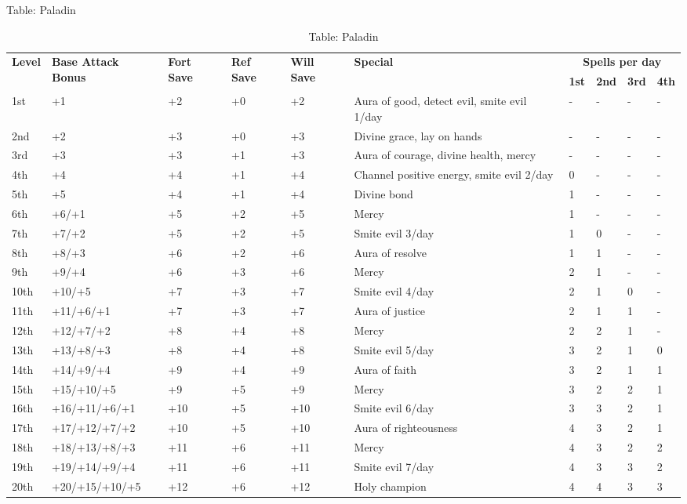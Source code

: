 Table: Paladin
\begin{table*}[]
\sffamily
\caption{Table: Paladin}
\begin{tabularx}{\linewidth}{lllllXllll}
\multirow{2}{*}{\textbf{Level}} & \multirow{2}{*}{\parbox{5em}{\textbf{Base Attack Bonus}}} & \multirow{2}{*}{\parbox{1.5em}{\textbf{Fort Save}}} & \multirow{2}{*}{\parbox{1.5em}{\textbf{Ref Save}}} & \multirow{2}{*}{\parbox{1.5em}{\textbf{Will Save}}} & \multirow{2}{*}{\textbf{Special}}  & \multicolumn{4}{c}{\textbf{Spells per day}} \\
                       &                                    &                            &                           &                            &                                                                        & \textbf{1st}  & \textbf{2nd} & \textbf{3rd} & \textbf{4th} \\
1st & +1 & +2 & +0 & +2 & Aura of good, detect evil, smite evil 1/day & - & - & - & -\\
2nd & +2 & +3 & +0 & +3 & Divine grace, lay on hands & - & - & - & -\\
3rd & +3 & +3 & +1 & +3 & Aura of courage, divine health, mercy & - & - & - & -\\
4th & +4 & +4 & +1 & +4 & Channel positive energy, smite evil 2/day & 0 & - & - & -\\
5th & +5 & +4 & +1 & +4 & Divine bond & 1 & - & - & -\\
6th & +6/+1 & +5 & +2 & +5 & Mercy & 1 & - & - & -\\
7th & +7/+2 & +5 & +2 & +5 & Smite evil 3/day & 1 & 0 & - & -\\
8th & +8/+3 & +6 & +2 & +6 & Aura of resolve & 1 & 1 & - & -\\
9th & +9/+4 & +6 & +3 & +6 & Mercy & 2 & 1 & - & -\\
10th & +10/+5 & +7 & +3 & +7 & Smite evil 4/day & 2 & 1 & 0 & -\\
11th & +11/+6/+1 & +7 & +3 & +7 & Aura of justice & 2 & 1 & 1 & -\\
12th & +12/+7/+2 & +8 & +4 & +8 & Mercy & 2 & 2 & 1 & -\\
13th & +13/+8/+3 & +8 & +4 & +8 & Smite evil 5/day & 3 & 2 & 1 & 0\\
14th & +14/+9/+4 & +9 & +4 & +9 & Aura of faith & 3 & 2 & 1 & 1\\
15th & +15/+10/+5 & +9 & +5 & +9 & Mercy & 3 & 2 & 2 & 1\\
16th & +16/+11/+6/+1 & +10 & +5 & +10 & Smite evil 6/day & 3 & 3 & 2 & 1\\
17th & +17/+12/+7/+2 & +10 & +5 & +10 & Aura of righteousness & 4 & 3 & 2 & 1\\
18th & +18/+13/+8/+3 & +11 & +6 & +11 & Mercy & 4 & 3 & 2 & 2\\
19th & +19/+14/+9/+4 & +11 & +6 & +11 & Smite evil 7/day & 4 & 3 & 3 & 2\\
20th & +20/+15/+10/+5 & +12 & +6 & +12 & Holy champion & 4 & 4 & 3 & 3\\
\end{tabularx}
\end{table*}


